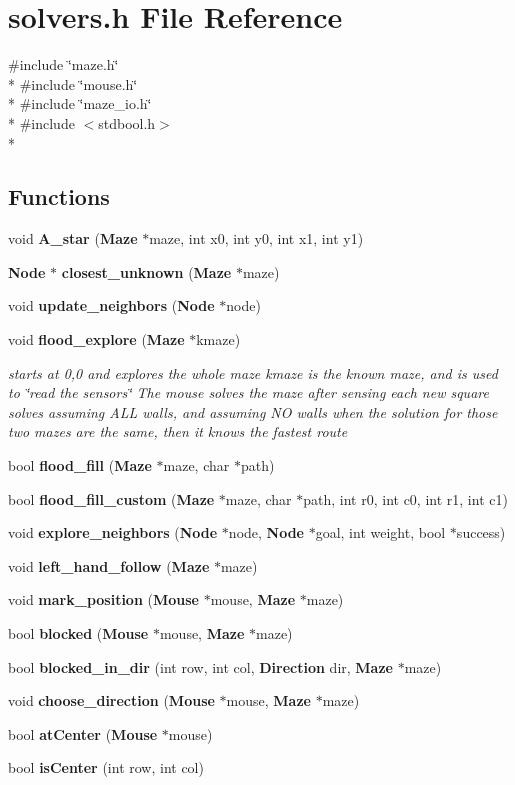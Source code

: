 \section{solvers.\-h File Reference}
\label{solvers_8h}
{\ttfamily \#include \char`\"{}maze.\-h\char`\"{}}\\*
{\ttfamily \#include \char`\"{}mouse.\-h\char`\"{}}\\*
{\ttfamily \#include \char`\"{}maze\-\_\-io.\-h\char`\"{}}\\*
{\ttfamily \#include $<$stdbool.\-h$>$}\\*
\subsection*{Functions}
\begin{DoxyCompactItemize}
\item 
void {\bf A\-\_\-star} ({\bf Maze} $\ast$maze, int x0, int y0, int x1, int y1)
\item 
{\bf Node} $\ast$ {\bf closest\-\_\-unknown} ({\bf Maze} $\ast$maze)
\item 
void {\bf update\-\_\-neighbors} ({\bf Node} $\ast$node)
\item 
void {\bf flood\-\_\-explore} ({\bf Maze} $\ast$kmaze)
\begin{DoxyCompactList}\small\item\em starts at 0,0 and explores the whole maze kmaze is the known maze, and is used to \char`\"{}read the sensors\char`\"{} The mouse solves the maze after sensing each new square solves assuming A\-L\-L walls, and assuming N\-O walls when the solution for those two mazes are the same, then it knows the fastest route \end{DoxyCompactList}\item 
bool {\bf flood\-\_\-fill} ({\bf Maze} $\ast$maze, char $\ast$path)
\item 
bool {\bf flood\-\_\-fill\-\_\-custom} ({\bf Maze} $\ast$maze, char $\ast$path, int r0, int c0, int r1, int c1)
\item 
void {\bf explore\-\_\-neighbors} ({\bf Node} $\ast$node, {\bf Node} $\ast$goal, int weight, bool $\ast$success)
\item 
void {\bf left\-\_\-hand\-\_\-follow} ({\bf Maze} $\ast$maze)
\item 
void {\bf mark\-\_\-position} ({\bf Mouse} $\ast$mouse, {\bf Maze} $\ast$maze)
\item 
bool {\bf blocked} ({\bf Mouse} $\ast$mouse, {\bf Maze} $\ast$maze)
\item 
bool {\bf blocked\-\_\-in\-\_\-dir} (int row, int col, {\bf Direction} dir, {\bf Maze} $\ast$maze)
\item 
void {\bf choose\-\_\-direction} ({\bf Mouse} $\ast$mouse, {\bf Maze} $\ast$maze)
\item 
bool {\bf at\-Center} ({\bf Mouse} $\ast$mouse)
\item 
bool {\bf is\-Center} (int row, int col)
\end{DoxyCompactItemize}


